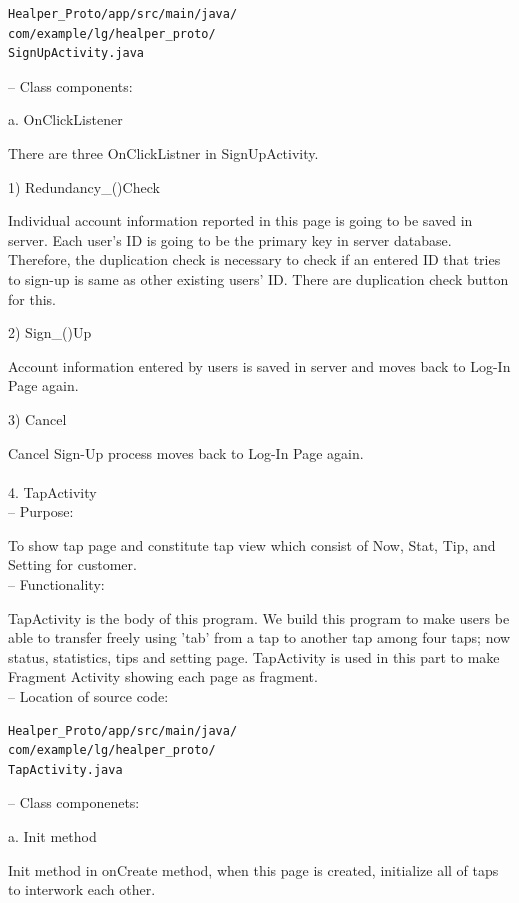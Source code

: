 \documentclass[conference]{IEEEtran}
\begin{document}
\begin{verbatim} 
Healper_Proto/app/src/main/java/
com/example/lg/healper_proto/
SignUpActivity.java
 \end{verbatim}
 
 --	Class components:

a. OnClickListener

There are three OnClickListner in SignUpActivity.

  1) Redundancy\_()Check

  Individual account information reported in this page is going to be saved in server. Each user's ID is going to be the primary key in server database. Therefore, the duplication check is necessary to check if an entered ID that tries to sign-up is same as other existing users' ID. There are duplication check button for this. 

  2) Sign\_()Up

  Account information entered by users is saved in server and moves back to Log-In Page again.

  3) Cancel

  Cancel Sign-Up process moves back to Log-In Page again.\\\\



4.	TapActivity\\
 
 --	Purpose:
 
To show tap page and constitute tap view which consist of Now, Stat, Tip, and Setting for customer.\\
 
 --	Functionality:

TapActivity is the body of this program. We build this program to make users be able to transfer freely using 'tab' from a tap to another tap among four taps; now status, statistics, tips and setting page. TapActivity is used in this part to make Fragment Activity showing each page as fragment.\\

 --	Location of source code:
 
\begin{verbatim}
Healper_Proto/app/src/main/java/
com/example/lg/healper_proto/
TapActivity.java
 \end{verbatim}
 
 --	Class componenets:

a. Init method

Init method in onCreate method, when this page is created, initialize all of taps to interwork each other. 
\end{document}
